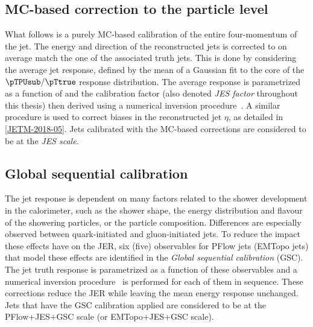 \subsection{MC-based correction to the particle level}
What follows is a purely MC-based calibration of the entire four-momentum of the jet. The energy and direction of the reconstructed jets is corrected to on average match the one of the associated truth jets. This is done by considering the average jet response, defined by the mean of a Gaussian fit to the core of the $\pTPUsub / \pTtrue$ response distribution. The average response is parametrized as a function of \pTPUsub and the \pT calibration factor (also denoted \emph{JES factor} throughout this thesis) then derived using a numerical inversion procedure~\cite{PERF-2011-03}. A similar procedure is used to correct biases in the reconstructed jet $\eta$, as detailed in \cref{JETM-2018-05}.
Jets calibrated with the MC-based corrections are considered to be at the \emph{JES scale}.

\subsection{Global sequential calibration}
The jet response is dependent on many factors related to the shower development in the calorimeter, such as the shower shape, the energy distribution and flavour of the showering particles, or the particle composition.
Differences are especially observed between quark-initiated and gluon-initiated jets.
To reduce the impact these effects have on the JER, six (five) observables for PFlow jets (EMTopo jets) that model these effects are identified in the \emph{Global sequential calibration} (GSC). The jet truth response is parametrized as a function of these observables and a numerical inversion procedure~\cite{PERF-2011-03} is performed for each of them in sequence.
These corrections reduce the JER while leaving the mean energy response unchanged.
Jets that have the GSC calibration applied are considered to be at the PFlow+JES+GSC scale (or EMTopo+JES+GSC scale).

